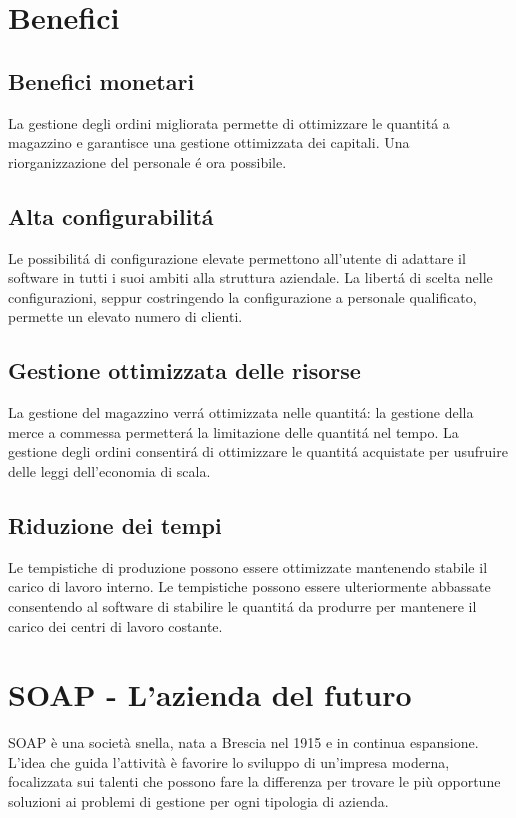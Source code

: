 \documentclass[../../documentazione.tex]{subfiles}
\begin{document}
    \section{Benefici}\label{sec:benefici}

    \subsection*{Benefici monetari}\label{subsec:benefici-monetari}
    La gestione degli ordini migliorata permette di ottimizzare le quantitá a magazzino e garantisce una gestione
    ottimizzata dei capitali.
    Una riorganizzazione del personale é ora possibile.

    \subsection*{Alta configurabilitá}\label{subsec:alta-configurabilitá}
    Le possibilitá di configurazione elevate permettono all'utente di adattare il software in tutti i suoi ambiti
    alla struttura aziendale.
    La libertá di scelta nelle configurazioni, seppur costringendo la configurazione a personale qualificato,
    permette un elevato numero di clienti.

    \subsection*{Gestione ottimizzata delle risorse}\label{subsec:gestione-ottimizzata-delle-risorse}
    La gestione del magazzino verrá ottimizzata nelle quantitá: la gestione della merce a commessa permetterá la limitazione
    delle quantitá nel tempo.
    La gestione degli ordini consentirá di ottimizzare le quantitá acquistate per usufruire delle leggi dell'economia di scala.

    \subsection*{Riduzione dei tempi}\label{subsec:riduzione-dei-tempi}
    Le tempistiche di produzione possono essere ottimizzate mantenendo stabile il carico di lavoro interno.
    Le tempistiche possono essere ulteriormente abbassate consentendo al software di stabilire le quantitá da produrre per
    mantenere il carico dei centri di lavoro costante.

    \section{SOAP - L'azienda del futuro}\label{sec:soap---l'azienda-del-futuro}
    SOAP è una società snella, nata a Brescia nel 1915 e in continua espansione.
    L'idea che guida l'attività è favorire lo sviluppo di un'impresa moderna, focalizzata sui talenti che possono fare
    la differenza per trovare le più opportune soluzioni ai problemi di gestione per ogni tipologia di azienda.
\end{document}
